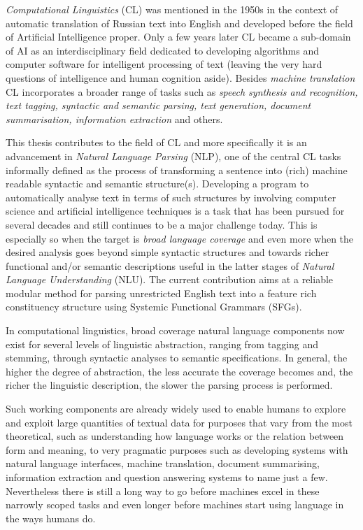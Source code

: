     \textit{Computational Linguistics} (CL) was mentioned in the 1950s in the context of automatic translation \citep{Hutchins1999} of Russian text into English and developed before the field of Artificial Intelligence proper. Only a few years later CL became a sub-domain of AI as an interdisciplinary field dedicated to developing algorithms and computer software for intelligent processing of text (leaving the very hard questions of intelligence and human cognition aside). Besides \textit{machine translation} CL incorporates a broader range of tasks such as \textit{speech synthesis and recognition, text tagging, syntactic and semantic parsing, text generation, document summarisation, information extraction} and others. 
    
    This thesis contributes to the field of CL and more specifically it is an advancement in \textit{Natural Language Parsing} (NLP), one of the central CL tasks informally defined as the process of transforming a sentence into (rich) machine readable syntactic and semantic structure(s). Developing a program to automatically analyse text in terms of such structures by involving computer science and artificial intelligence techniques is a task that has been pursued for several decades and still continues to be a major challenge today. This is especially so when the target is \textit{broad language coverage} and even more when the desired analysis goes beyond simple syntactic structures and towards richer functional and/or semantic descriptions useful in the latter stages of \textit{Natural Language Understanding} (NLU). The current contribution aims at a reliable modular method for parsing unrestricted English text into a feature rich constituency structure using Systemic Functional Grammars (SFGs). 
    
    In computational linguistics, broad coverage natural language components now exist for several levels of linguistic abstraction, ranging from tagging and stemming, through syntactic analyses to semantic specifications. In general, the higher the degree of abstraction, the less accurate the coverage becomes and, the richer the linguistic description, the slower the parsing process is performed. 
    
    Such working components are already widely used to enable humans to explore and exploit large quantities of textual data for purposes that vary from the most theoretical, such as understanding how language works or the relation between form and meaning, to very pragmatic purposes such as developing systems with natural language interfaces, machine translation, document summarising, information extraction and question answering systems to name just a few. Nevertheless there is still a long way to go before machines excel in these narrowly scoped tasks and even longer before machines start using language in the ways humans do.
    
